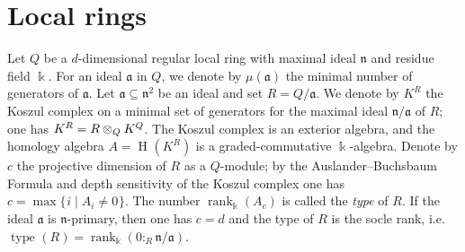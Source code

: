 \documentclass{amsart}
\theoremstyle{bfupright head,upright body}
\theoremstyle{fixed bf head,slanted body}
\theoremstyle{fixed bf head,upright body}
\theoremstyle{numbered paragraph}
\newcommand{\setof}[3][\mspace{1mu}]{\{#1#2 \mid #3#1\}}
\newcommand{\kk}{\Bbbk}
\newcommand{\n}{\mathfrak{n}}
\renewcommand{\H}[2][]{\operatorname{H}_{#1}(#2)}
\newcommand{\rnk}[2][k]{\operatorname{rank}_{#1}#2}
\newcommand{\type}[2][R]{\operatorname{type}_{#1}#2}
\newcommand{\tp}[3][R]{\nobreak{#2\otimes_{#1}#3}}
\newcommand{\fa}{\mathfrak{a}}
\numberwithin{equation}{res}
\begin{document}
\section{Local rings}
\label{sec:G from Gor}

\noindent
Let $Q$ be a $d$-dimensional regular local ring with maximal ideal
$\n$ and residue field $\kk$.  For an ideal $\fa$ in $Q$, we denote by
$\mu(\fa)$ the minimal number of generators of $\fa$. Let $\fa
\subseteq \n^2$ be an ideal and set $R=Q/\fa$. We denote by $K^R$ the
Koszul complex on a minimal set of generators for the maximal ideal
$\n/\fa$ of $R$; one has $K^R = \tp[Q]{R}{K^Q}$. The Koszul complex is
an exterior algebra, and the homology algebra $A=\H{K^R}$ is a
graded-commutative $\kk$-algebra. Denote by $c$ the projective
dimension of $R$ as a $Q$-module; by the Auslander--Buchsbaum Formula
and depth sensitivity of the Koszul complex one has $c =
\max\setof{i}{A_i\ne 0}$.  The number $\rnk[\kk]{(A_c)}$ is called the
\emph{type} of $R$. If the ideal $\fa$ is $\n$-primary, then one has
$c=d$ and the type of $R$ is the socle rank, i.e.\ $\type[]{(R)} =
\rnk[\kk]{(0 :_R \n/\fa)}$.
\end{document}

